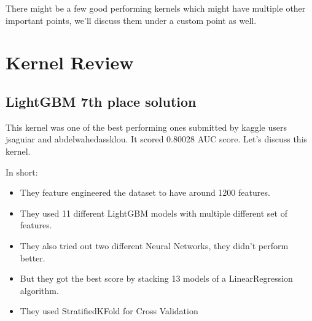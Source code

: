 \documentclass[twoside,a4paper]{article}
\begin{document}
There might be a few good performing kernels which might have multiple other important points, we'll discuss them under a custom point as well.








\section{Kernel Review}

\subsection{LightGBM 7th place solution}

This kernel was one of the best performing ones submitted by kaggle users jsaguiar and abdelwahedassklou. It scored 0.80028 AUC score. Let's discuss this kernel. 

In short\cite{discussionlightgbm}:
\begin{itemize}
    \item They feature engineered the dataset to have around 1200 features.
    \item They used 11 different LightGBM\cite{lgbm:2017} models with multiple different set of features.
    \item They also tried out two different Neural Networks, they didn't perform better.
    \item But they got the best score by stacking 13 models of a LinearRegression\cite{linearregression:2021} algorithm.
    \item They used StratifiedKFold\cite{stratifiedkfold:2000} for Cross Validation
\end{itemize}
\end{document}

